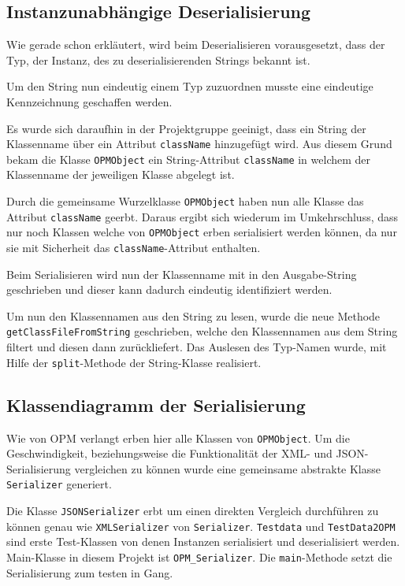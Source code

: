 

\subsection{Instanzunabh\"angige Deserialisierung}
Wie gerade schon erkl\"autert, wird beim Deserialisieren vorausgesetzt, dass der Typ, der Instanz, des zu deserialisierenden Strings bekannt ist.

Um den String nun eindeutig einem Typ zuzuordnen musste eine eindeutige Kennzeichnung geschaffen werden.

Es wurde sich daraufhin in der Projektgruppe geeinigt, dass ein String der Klassenname \"uber ein Attribut \texttt{className} hinzugef\"ugt wird. Aus diesem Grund bekam die Klasse \texttt{OPMObject} ein String-Attribut \texttt{className} in welchem der Klassenname der jeweiligen Klasse abgelegt ist.

Durch die gemeinsame Wurzelklasse \texttt{OPMObject} haben nun alle Klasse das Attribut \texttt{className} geerbt. 
Daraus ergibt sich wiederum im Umkehrschluss, dass nur noch Klassen welche von \texttt{OPMObject} erben serialisiert werden k\"onnen, da nur sie mit Sicherheit das \texttt{className}-Attribut enthalten.

Beim Serialisieren wird nun der Klassenname mit in den Ausgabe-String geschrieben und dieser kann dadurch eindeutig identifiziert werden.

Um nun den Klassennamen aus den String zu lesen, wurde die neue Methode \\\texttt{getClassFileFromString} geschrieben, welche den Klassennamen aus dem String filtert und diesen dann zur\"uckliefert. Das Auslesen des Typ-Namen wurde, mit Hilfe der \texttt{split}-Methode der String-Klasse realisiert.

\subsection{Klassendiagramm der Serialisierung}

Wie von OPM verlangt erben hier alle Klassen von \texttt{OPMObject}. Um die Geschwindigkeit, beziehungsweise die Funktionalit\"at der XML- und JSON-Serialisierung vergleichen zu k\"onnen wurde eine gemeinsame abstrakte Klasse \texttt{Serializer} generiert. 

Die Klasse \texttt{JSONSerializer} erbt um einen direkten Vergleich durchf\"uhren zu k\"onnen genau wie \texttt{XMLSerializer} von \texttt{Serializer}.
\texttt{Testdata} und \texttt{TestData2OPM} sind erste Test-Klassen von denen Instanzen serialisiert und deserialisiert werden.
Main-Klasse in diesem Projekt ist \texttt{OPM\_Serializer}. Die \texttt{main}-Methode setzt die Serialisierung zum testen in Gang.

